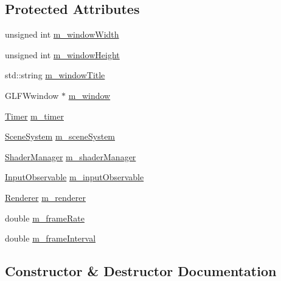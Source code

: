 \subsection*{Protected Attributes}
\begin{DoxyCompactItemize}
\item 
unsigned int \mbox{\hyperlink{classec_1_1_window_a123952ed65bb1099068dd7ca2781bd4b}{m\+\_\+window\+Width}}
\item 
unsigned int \mbox{\hyperlink{classec_1_1_window_a1beba0a39ddf045ba3ec441b2147a874}{m\+\_\+window\+Height}}
\item 
std\+::string \mbox{\hyperlink{classec_1_1_window_a2f9c3a96c57440be25c92fc09e8913d2}{m\+\_\+window\+Title}}
\item 
G\+L\+F\+Wwindow $\ast$ \mbox{\hyperlink{classec_1_1_window_a6d40786a23714fff2de92ed74e8eb10e}{m\+\_\+window}}
\item 
\mbox{\hyperlink{classec_1_1_timer}{Timer}} \mbox{\hyperlink{classec_1_1_window_af826de73c15768bf1a4ee5dbff0e377c}{m\+\_\+timer}}
\item 
\mbox{\hyperlink{classec_1_1_scene_system}{Scene\+System}} \mbox{\hyperlink{classec_1_1_window_a5c50dfac91e6105a6862693e71976a3e}{m\+\_\+scene\+System}}
\item 
\mbox{\hyperlink{classec_1_1_shader_manager}{Shader\+Manager}} \mbox{\hyperlink{classec_1_1_window_ad4b04fabdef20b69206562d2703a7bf9}{m\+\_\+shader\+Manager}}
\item 
\mbox{\hyperlink{classec_1_1_input_observable}{Input\+Observable}} \mbox{\hyperlink{classec_1_1_window_a070efea3cadf4eaee9af066b7b21d595}{m\+\_\+input\+Observable}}
\item 
\mbox{\hyperlink{classec_1_1_renderer}{Renderer}} \mbox{\hyperlink{classec_1_1_window_a6951a4d1a08549dcc797cf12c8f46710}{m\+\_\+renderer}}
\item 
double \mbox{\hyperlink{classec_1_1_window_aa7245d9cfc57373c805b63ba3e8826f8}{m\+\_\+frame\+Rate}}
\item 
double \mbox{\hyperlink{classec_1_1_window_a6c56361d6931e3a5a6dcfe7a08c25e09}{m\+\_\+frame\+Interval}}
\end{DoxyCompactItemize}


\subsection{Constructor \& Destructor Documentation}
\mbox{\label{classec_1_1_window_af9eab51c6ea017a296866278bbbcdb28}} 
